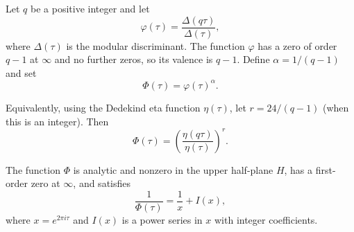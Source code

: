 Let $q$ be a positive integer and let
$$\varphi(\tau) = \frac{\Delta(q\tau)}{\Delta(\tau)},$$
where $\Delta(\tau)$ is the modular discriminant. The function $\varphi$ has a zero of order $q-1$ at $\infty$ and no further zeros, so its valence is $q-1$. Define $\alpha = 1/(q-1)$ and set
$$\Phi(\tau) = \varphi(\tau)^\alpha.$$

Equivalently, using the Dedekind eta function $\eta(\tau)$, let $r = 24/(q-1)$ (when this is an integer). Then
$$\Phi(\tau) = \left(\frac{\eta(q\tau)}{\eta(\tau)}\right)^r.$$

The function $\Phi$ is analytic and nonzero in the upper half-plane $H$, has a first-order zero at $\infty$, and satisfies
$$\frac{1}{\Phi(\tau)} = \frac{1}{x} + I(x),$$
where $x = e^{2\pi i\tau}$ and $I(x)$ is a power series in $x$ with integer coefficients.

